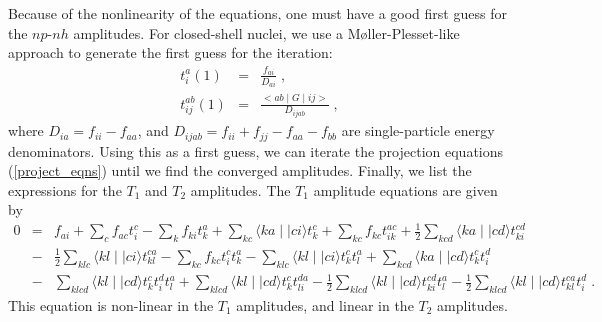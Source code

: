 \documentclass[twoside,12pt]{article}
\begin{document}
Because of the nonlinearity of the equations,
one must have a good first guess for the $np$-$nh$ amplitudes. 
For closed-shell nuclei, we
use a M\o ller-Plesset-like approach to generate the first guess 
for the iteration: 
\begin{eqnarray}
t^a_i(1) &=& \frac{f_{ai}}{D_{ai}} \;, \nonumber \\ 
t^{ab}_{ij}(1) &=& \frac{<ab\mid G \mid ij>}{D_{ijab}} \;,
\label{amp_start}
\end{eqnarray}
where $D_{ia}=f_{ii}-f_{aa}$, and $D_{ijab}=f_{ii}+f_{jj}-f_{aa}-f_{bb}$
are single-particle energy denominators. 
Using this as a first guess, we can iterate the projection
equations 
(\ref{project_eqns})
until we find the converged amplitudes. Finally, we list the expressions for the 
$T_1$ and $T_2$ amplitudes.
The $T_1$ amplitude equations are given by
\begin{eqnarray}
0 & = & f_{ai} + \sum_cf_{ac}t^c_i - \sum_k f_{ki}t^a_k +  
\sum_{kc}\langle ka\mid\mid ci\rangle t^c_k + \sum_{kc}f_{kc}t^{ac}_{ik}
+\frac{1}{2}\sum_{kcd}\langle ka\mid\mid cd\rangle t^{cd}_{ki} \nonumber \\
  & - & \frac{1}{2}\sum_{klc}\langle kl\mid\mid ci \rangle t^{ca}_{kl}
-\sum_{kc}f_{kc}t^c_it^a_k -\sum_{klc}\langle kl\mid\mid ci\rangle t^c_k t^a_l
+\sum_{kcd} \langle ka\mid\mid cd \rangle t^c_k t^d_i  \nonumber \\
  & - & \sum_{klcd}\langle kl\mid\mid cd\rangle t^c_kt^d_it^a_l
+ \sum_{klcd}\langle kl\mid\mid cd\rangle t^c_kt^{da}_{li}
- \frac{1}{2} \sum_{klcd}\langle kl\mid\mid cd\rangle t^{cd}_{ki}t^{a}_{l}
- \frac{1}{2} \sum_{klcd}\langle kl\mid\mid cd\rangle t^{ca}_{kl}t^{d}_{i}\;.
\label{t1_eqn}
\end{eqnarray}
This equation is non-linear in the $T_1$ amplitudes, and linear in
the $T_2$ amplitudes. 
\end{document}
